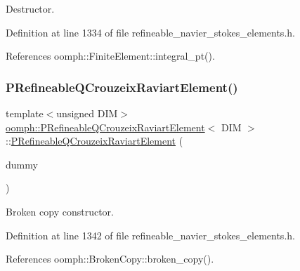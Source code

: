 Destructor. 



Definition at line 1334 of file refineable\+\_\+navier\+\_\+stokes\+\_\+elements.\+h.



References oomph\+::\+Finite\+Element\+::integral\+\_\+pt().

\mbox{\label{classoomph_1_1PRefineableQCrouzeixRaviartElement_a4b777fda0ed91d4ca0181fb3705b2af3}} 
\subsubsection{\texorpdfstring{P\+Refineable\+Q\+Crouzeix\+Raviart\+Element()}{PRefineableQCrouzeixRaviartElement()}\hspace{0.1cm}{\footnotesize\ttfamily [2/2]}}
{\footnotesize\ttfamily template$<$unsigned D\+IM$>$ \\
\hyperlink{classoomph_1_1PRefineableQCrouzeixRaviartElement}{oomph\+::\+P\+Refineable\+Q\+Crouzeix\+Raviart\+Element}$<$ D\+IM $>$\+::\hyperlink{classoomph_1_1PRefineableQCrouzeixRaviartElement}{P\+Refineable\+Q\+Crouzeix\+Raviart\+Element} (\begin{DoxyParamCaption}\item[{const \hyperlink{classoomph_1_1PRefineableQCrouzeixRaviartElement}{P\+Refineable\+Q\+Crouzeix\+Raviart\+Element}$<$ D\+IM $>$ \&}]{dummy }\end{DoxyParamCaption})\hspace{0.3cm}{\ttfamily [inline]}}



Broken copy constructor. 



Definition at line 1342 of file refineable\+\_\+navier\+\_\+stokes\+\_\+elements.\+h.



References oomph\+::\+Broken\+Copy\+::broken\+\_\+copy().



